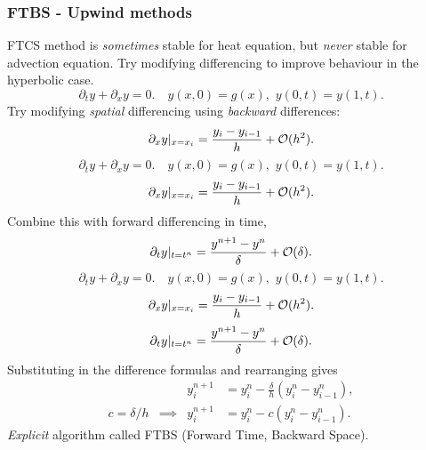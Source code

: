 \documentclass{beamer}
\begin{document}
\begin{frame}
  \frametitle{FTBS - Upwind methods}

  \begin{overlayarea}{\textwidth}{0.8\textheight}
    {
      FTCS method is \emph{sometimes} stable for
      heat equation, but \emph{never} stable for advection
      equation. Try modifying differencing to improve
      behaviour in the hyperbolic case.
    }
    {
      \begin{equation*}
        \partial_{t} y + \partial_{x} y = 0. \quad y(x, 0) = g(x),
        \,\, y(0, t) = y(1, t).
      \end{equation*}
      Try modifying \emph{spatial} differencing using \emph{backward}
      differences:
      \begin{equation*}
        \partial_{x} y |_{x = x_i} = \frac{y_{i} - y_{i-1}}{h} + {\cal
          O}(h^2).
      \end{equation*}
    }
    {
      \begin{equation*}
        \partial_{t} y + \partial_{x} y = 0. \quad y(x, 0) = g(x),
        \,\, y(0, t) = y(1, t).
      \end{equation*}
      \begin{equation*}
        \partial_{x} y |_{x = x_i} = \frac{y_{i} - y_{i-1}}{h} + {\cal
          O}(h^2).
      \end{equation*}
      Combine this with forward differencing in time,
      \begin{equation*}
        \partial_t y |_{t = t^n} = \frac{y^{n+1} - y^n}{\delta} + {\cal
          O}(\delta).
      \end{equation*}
    }
    {
      \begin{equation*}
        \partial_{t} y + \partial_{x} y = 0. \quad y(x, 0) = g(x),
        \,\, y(0, t) = y(1, t).
      \end{equation*}
      \begin{equation*}
        \partial_{x} y |_{x = x_i} = \frac{y_{i} - y_{i-1}}{h} + {\cal
          O}(h^2).
      \end{equation*}
      \begin{equation*}
        \partial_t y |_{t = t^n} = \frac{y^{n+1} - y^n}{\delta} + {\cal
          O}(\delta).
      \end{equation*}
      Substituting in the difference formulas and rearranging gives
      \begin{align*}
        && y_i^{n+1} & = y_i^n - \frac{\delta}{h} \left( y_{i}^n -
          y_{i-1}^n \right), \\
        c = \delta / h & \implies &
        y_i^{n+1} & = y_i^n - c \left( y_{i}^n - y_{i-1}^n \right).
      \end{align*}
    }
    {
      \emph{Explicit} algorithm called FTBS (Forward Time,
      Backward Space).
    }
  \end{overlayarea}

\end{frame}
\end{document}
